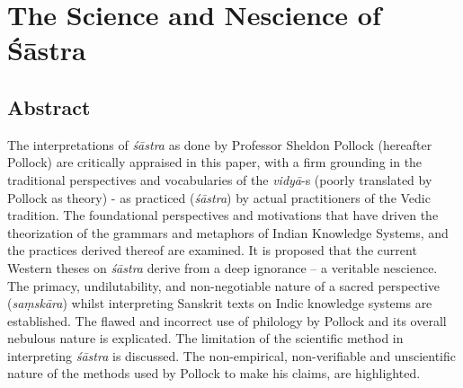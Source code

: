 \chapter{The Science and Nescience of Śāstra}\label{chapter6}
\vskip -10pt


\vskip -10pt


\section*{Abstract}

The interpretations of {\sl śāstra} as done by Professor Sheldon Pollock (hereafter Pollock) are critically appraised in this paper, with a firm grounding in the traditional perspectives and vocabularies of the {\sl vidyā}-s (poorly translated by Pollock as theory) - as practiced ({\sl śāstra}) by actual practitioners of the Vedic tradition. The foundational perspectives and motivations that have driven the theorization of the grammars and metaphors of Indian Knowledge Systems, and the practices derived thereof are examined. It is proposed that the current Western theses on {\sl śāstra} derive from a deep ignorance -- a veritable nescience. The primacy, undilutability, and non-negotiable nature of a sacred perspective ({\sl saṃskāra}) whilst interpreting Sanskrit texts on Indic knowledge systems are established. The flawed and incorrect use of philology by Pollock and its overall nebulous nature is explicated. The limitation of the scientific method in interpreting {\sl śāstra} is discussed. The non-empirical, non-verifiable and unscientific nature of the methods used by Pollock to make his claims, are highlighted. 

